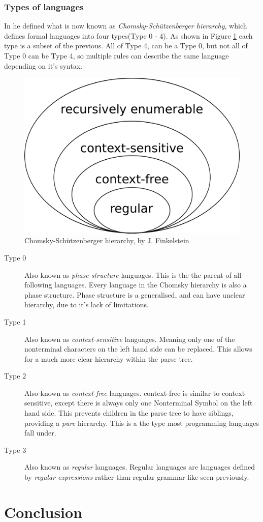 \subsubsection{Types of languages}
In \autocite{Chomsky} he defined what is now known as \textit{Chomsky-Schützenberger hierarchy}, which defines formal languages into four types(Type 0 - 4). As shown in Figure \ref{fig:Chomsky} each type is a subset of the previous. All of Type 4, can be a Type 0, but not all of Type 0 can be Type 4, so multiple rules can describe the same language depending on it's syntax.
\begin{figure}[ht!]
    \centerline{\includegraphics[width=0.5\linewidth]{img/Chomsky.png}}
    \caption{Chomsky-Schützenberger hierarchy, by J. Finkelstein}
    \label{fig:Chomsky}
\end{figure}
\begin{description}
    \item[Type 0] Also known as \textit{phase structure} languages. This is the the parent of all following languages. Every language in the Chomsky hierarchy is also a phase structure. Phase structure is a generalised, and can have unclear hierarchy, due to it's lack of limitations.
    \item[Type 1] Also known as \textit{context-sensitive} languages. Meaning only one of the nonterminal characters on the left hand side can be replaced. This allows for a much more clear hierarchy within the parse tree.
    \item[Type 2] Also known as \textit{context-free} languages. context-free is similar to context sensitive, except there is always only one Nonterminal Symbol on the left hand side. This prevents children in the parse tree to have siblings, providing a \textit{pure} hierarchy. This is a the type most programming languages fall under.
    \item[Type 3]  Also known as \textit{regular} languages. Regular languages are languages defined by \textit{regular expressions} rather than regular grammar like seen previously.
\end{description}

\newpage
\section{Conclusion}